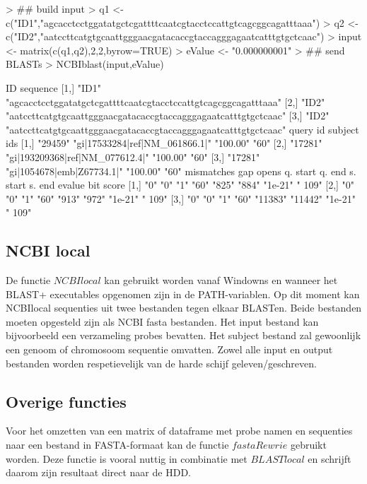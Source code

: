 \documentclass[a4paper]{article}
\begin{document}
\begin{Schunk}
\begin{Sinput}
> ## build input
> q1 <- c("ID1","agcacctcctggatatgctcgattttcaatcgtacctccattgtcagcggcagatttaaa")
> q2 <- c("ID2","aatccttcatgtgcaattgggaacgatacaccgtaccagggagaatcatttgtgctcaac")
> input <- matrix(c(q1,q2),2,2,byrow=TRUE)
> eValue <- "0.000000001"
> ## send BLASTs
> NCBIblast(input,eValue)
\end{Sinput}
\begin{Soutput}
     ID    sequence                                                      
[1,] "ID1" "agcacctcctggatatgctcgattttcaatcgtacctccattgtcagcggcagatttaaa"
[2,] "ID2" "aatccttcatgtgcaattgggaacgatacaccgtaccagggagaatcatttgtgctcaac"
[3,] "ID2" "aatccttcatgtgcaattgggaacgatacaccgtaccagggagaatcatttgtgctcaac"
     query id subject ids                     % identity alignment length
[1,] "29459"  "gi|17533284|ref|NM_061866.1|"  "100.00"   "60"            
[2,] "17281"  "gi|193209368|ref|NM_077612.4|" "100.00"   "60"            
[3,] "17281"  "gi|1054678|emb|Z67734.1|"      "100.00"   "60"            
     mismatches gap opens q. start q. end s. start s. end  evalue  bit score
[1,] "0"        "0"       "1"      "60"   "825"    "884"   "1e-21" " 109"   
[2,] "0"        "0"       "1"      "60"   "913"    "972"   "1e-21" " 109"   
[3,] "0"        "0"       "1"      "60"   "11383"  "11442" "1e-21" " 109"   
\end{Soutput}
\end{Schunk}
\subsection*{NCBI local}
De functie $NCBIlocal$ kan gebruikt worden vanaf Windowns en wanneer het BLAST+ executables opgenomen zijn in de PATH-variablen. Op dit moment kan NCBIlocal sequenties uit twee bestanden tegen elkaar BLASTen. Beide bestanden moeten opgesteld zijn als NCBI fasta bestanden\cite{NCBIfasta}. Het input bestand kan bijvoorbeeld een verzameling probes bevatten. Het subject bestand zal gewoonlijk een genoom of chromosoom sequentie omvatten. Zowel alle input en output bestanden worden respetievelijk van de harde schijf geleven/geschreven.
\subsection*{Overige functies}
Voor het omzetten van een matrix of dataframe met probe namen en sequenties naar een bestand in FASTA-formaat kan de functie $fastaRewrie$ gebruikt worden. Deze functie is vooral nuttig in combinatie met $BLASTlocal$ en schrijft daarom zijn resultaat direct naar de HDD.
\end{document}
